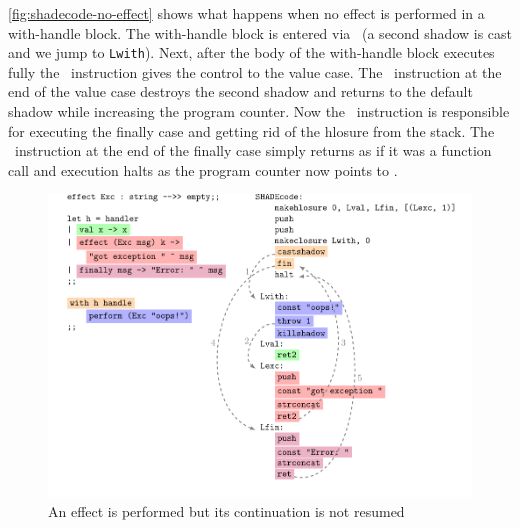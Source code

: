 \documentclass[class=article, crop=false]{standalone}
\begin{document}
\autoref{fig:shadecode-no-effect} shows what happens when no effect is performed
in a with-handle block. The with-handle block is entered via \vmCastShadow\
(a second shadow is cast and we jump to \lstinline{Lwith}). Next, after the
body of the with-handle block executes fully the \vmKillShadow\ instruction
gives the control to the value case. The \vmRett\ instruction at the end of
the value case destroys the second shadow and returns to the default shadow
while increasing the program counter. Now the \vmFin\ instruction is responsible
for executing the finally case and getting rid of the hlosure from the stack.
The \vmRet\ instruction at the end of the finally case simply returns as if it
was a function call and execution halts as the program counter now points to
\vmHalt.

\begin{figure}[htb]
    \centering
    \includegraphics[height=.45\textheight]{../figures/impl-exception.pdf}

    \caption{An effect is performed but its continuation is not resumed}
    \label{fig:shadecode-exception}
\end{figure}
%
\end{document}
